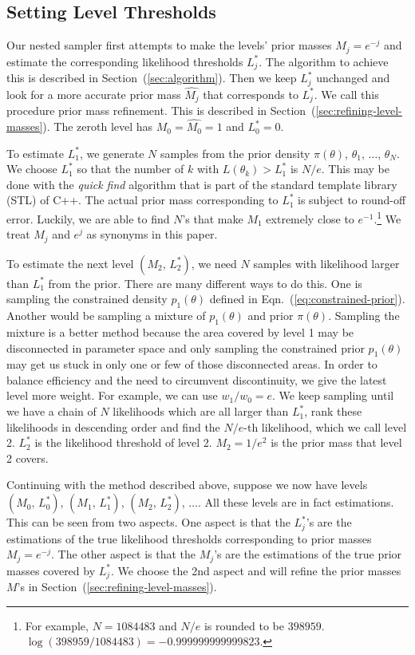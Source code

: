 \documentclass[letterpaper, preprint]{aastex}
\begin{document}
\subsection{Setting Level Thresholds}
\label{sec:constructing}
Our nested sampler first attempts to make the levels' prior masses $M_j = e^{-j}$ and estimate the corresponding likelihood thresholds $L^*_j$. The algorithm to achieve this is described in Section~(\ref{sec:algorithm}). Then we keep $L^*_j$ unchanged and look for a more accurate prior mass $\widehat{M_j}$ that corresponds to $L^*_j$. We call this procedure prior mass refinement. This is described in Section~(\ref{sec:refining-level-masses}). The zeroth level has $M_0 =\widehat{M_0}= 1$ and $L^*_0 = 0$.

To estimate $L^*_1$, we generate $N$ samples from the prior density $\pi(\theta)$, $\theta_1$, $\ldots$, $\theta_N$. We choose $L^*_1$ so that the number of $k$ with $L(\theta_k) > L^*_1$ is $N/e$. This may be done with the {\em quick find} algorithm that is part of the standard template library (STL) of C++. The actual prior mass corresponding to $L^*_1$ is subject to round-off error. Luckily, we are able to find $N$'s that make $M_1$ extremely close to $e^{-1}$.\footnote{For example, $N=1084483$ and $N/e$ is rounded to be $398959$. $\log{(398959/1084483)}=-0.999999999999823$.} We treat $M_j$ and $e^j$ as synonyms in this paper. 

To estimate the next level $\left(M_2, \,L^*_2\right)$, we need $N$ samples with likelihood larger than $L^*_1$ from the prior. There are many different ways to do this. One is sampling the constrained density $p_{1}(\theta)$ defined in Eqn.~(\ref{eq:constrained-prior}). Another would be sampling a mixture of $p_{1}(\theta)$ and prior $\pi(\theta)$. Sampling the mixture is a better method because the area covered by level 1 may be disconnected in parameter space and only sampling the constrained prior $p_{1}(\theta)$ may get us stuck in only one or few of those disconnected areas. In order to balance efficiency and the need to circumvent discontinuity, we give the latest level more weight. For example, we can use $w_1/w_0=e$. We keep sampling until we have a chain of $N$ likelihoods which are all larger than $L^*_1$, rank these likelihoods in descending order and find the $N/e$-th likelihood, which we call level 2. $L_2^*$ is the likelihood threshold of level 2. $M_2=1/e^2$ is the prior mass that level 2 covers. 

Continuing with the method described above, suppose we now have levels $(M_0,\,L^*_0)$, $(M_1,\,L^*_1)$, $(M_2,\,L^*_2)$, $\ldots$. All these levels are in fact estimations. This can be seen from two aspects. One aspect is that the $L^*_j$'s are the estimations of the true likelihood thresholds corresponding to prior masses $M_j=e^{-j}$. The other aspect is that the $M_j$'s are the estimations of the true prior masses covered by $L^*_j$. We choose the 2nd aspect and will refine the prior masses $M$'s in Section~(\ref{sec:refining-level-masses}).
\end{document}
